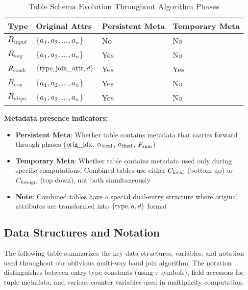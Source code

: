 \begin{table}[!htbp]
\centering
\caption{Table Schema Evolution Throughout Algorithm Phases}
\label{tab:table-schemas}
\small
\begin{tabular}{|p{2cm}|p{3.5cm}|p{3.5cm}|p{3cm}|}
\hline
\textbf{Type} & \textbf{Original Attrs} & \textbf{Persistent Meta} & \textbf{Temporary Meta} \\
\hline
$R_{input}$ & $\{a_1, a_2, \ldots, a_n\}$ & No & No \\
\hline
$R_{aug}$ & $\{a_1, a_2, \ldots, a_n\}$ & Yes & No \\
\hline
$R_{\text{comb}}$ & $\{\text{type}, \text{join\_attr}, d\}$ & Yes & Yes \\
\hline
$R_{exp}$ & $\{a_1, a_2, \ldots, a_n\}$ & Yes & No \\
\hline
$R_{align}$ & $\{a_1, a_2, \ldots, a_n\}$ & Yes & No \\
\hline
\end{tabular}
\end{table}

\textbf{Metadata presence indicators:}
\begin{itemize}
\item \textbf{Persistent Meta}: Whether table contains metadata that carries forward through phases ($\text{orig\_idx}$, $\alpha_{\text{local}}$, $\alpha_{\text{final}}$, $F_{\text{sum}}$)
\item \textbf{Temporary Meta}: Whether table contains metadata used only during specific computations. Combined tables use either $C_{\text{local}}$ (bottom-up) or $C_{\text{foreign}}$ (top-down), not both simultaneously
\item \textbf{Note}: Combined tables have a special dual-entry structure where original attributes are transformed into $\{\text{type}, a, d\}$ format
\end{itemize}

\subsection{Data Structures and Notation}

The following table summarizes the key data structures, variables, and notation used throughout our oblivious multi-way band join algorithm. The notation distinguishes between entry type constants (using $\tau$ symbols), field accessors for tuple metadata, and various counter variables used in multiplicity computation.


